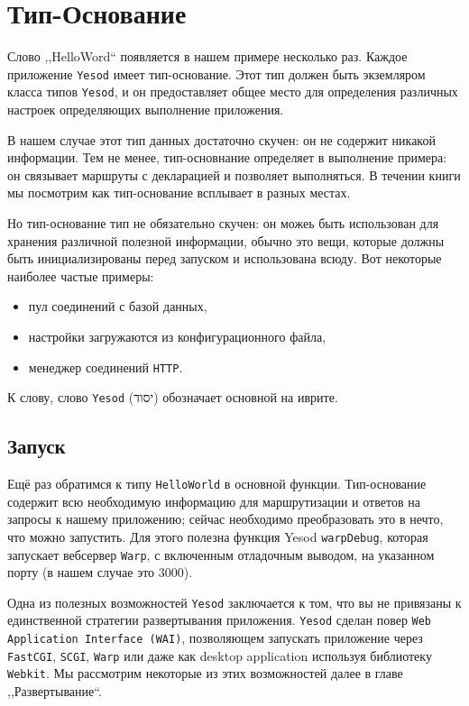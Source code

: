 \section{Тип-Основание}

Слово ,,HelloWord`` появляется в нашем примере несколько раз. Каждое приложение 
\texttt{Yesod} имеет тип-основание. Этот тип должен быть экземляром класса 
типов \texttt{Yesod}, и он предоставляет общее место для определения 
различных настроек определяющих выполнение приложения.

В нашем случае этот тип данных достаточно скучен: он не содержит никакой 
информации. Тем не менее, тип-основнание определяет в выполнение примера: 
он связывает маршруты с декларацией и позволяет выполняться. 
В течении книги мы посмотрим как тип-основание всплывает в разных местах.

Но тип-основание тип не обязательно скучен: он можеь быть использован для 
хранения различной полезной информации, обычно это вещи,
которые должны быть инициализированы перед запуском и 
использована всюду. Вот некоторые наиболее частые примеры:

\begin{itemize}
  \item пул соединений с базой данных,
  \item настройки загружаются из конфигурационного файла,
  \item менеджер соединений \texttt{HTTP}.
\end{itemize}

К слову, слово \texttt{Yesod} (יסוד) обозначает основной на иврите.

\subsection{Запуск}

Ещё раз обратимся к типу \lstinline!HelloWorld! в основной функции.
Тип-основание содержит всю необходимую информацию для маршрутизации и 
ответов на запросы к нашему приложению;
сейчас необходимо преобразовать это в нечто, что можно запустить. 
Для этого полезна функция Yesod \lstinline!warpDebug!, которая 
запускает вебсервер \texttt{Warp}, с включенным отладочным
выводом, на указанном порту (в нашем случае это $3000$).

Одна из полезных возможностей \texttt{Yesod} заключается к том, 
что вы не привязаны к единственной стратегии развертывания приложения. 
\texttt{Yesod} сделан повер \texttt{Web Application Interface (WAI)}, 
позволяющем запускать приложение через \texttt{FastCGI}, 
\texttt{SCGI}, \texttt{Warp} или даже как 
desktop application используя библиотеку
\texttt{Webkit}. Мы рассмотрим некоторые из этих возможностей 
далее в главе ,,Развертывание``.


